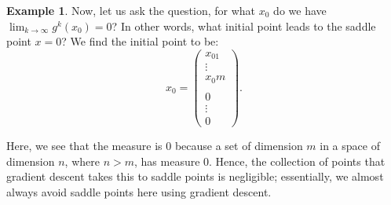 \documentclass[twoside]{article}
\theoremstyle{definition}
\theoremstyle{definition}
\newtheorem{exmp}{Example}
\theoremstyle{remark}
\begin{document}
\begin{exmp}
Now, let us ask the question, for what $x_0$ do we have $\lim_{k\to\infty} g^k(x_0) = 0$? In other words, what initial point leads to the saddle point $x=0$? We find the initial point to be:
\[
x_0 = \left(\begin{smallmatrix}x_01 \\ \vdots \\ x_0m \\ \ \\ 0 \\ \vdots \\ 0 \end{smallmatrix}\right).
\]

Here, we see that the measure is 0 because a set of dimension $m$ in a space of dimension $n$, where $n > m$, has measure 0. Hence, the collection of points that gradient descent takes this to saddle points is negligible; essentially, we almost always avoid saddle points here using gradient descent.
\end{exmp}
\end{document}
